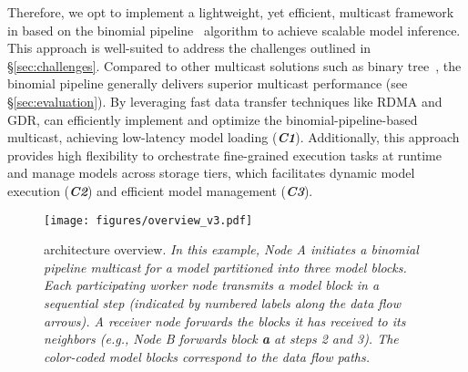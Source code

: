 Therefore, we opt to implement a lightweight, yet efficient, multicast framework in \SysName based on the binomial pipeline~\cite{binomial-pipe,rdmc} algorithm to achieve scalable model inference. 
This approach is well-suited to address the challenges outlined in \S\ref{sec:challenges}. 
Compared to other multicast solutions such as binary tree~\cite{wang_faasnet_nodate}, the binomial pipeline generally delivers superior multicast performance (see \S\ref{sec:evaluation}). 
By leveraging fast data transfer techniques like RDMA and GDR, \SysName can efficiently implement and optimize the binomial-pipeline-based multicast, achieving low-latency model loading (\textbf{\emph{C1}}). 
Additionally, this approach provides high flexibility to orchestrate fine-grained execution tasks at runtime and manage models across storage tiers, which facilitates dynamic model execution (\textbf{\emph{C2}}) and efficient model management (\textbf{\emph{C3}}).


\begin{figure}
    \centering
    \texttt{[image: figures/overview\_v3.pdf]} 
    \vspace{-10pt} 
    \caption{\SysName architecture overview. 
    \textit{\textmd{In this example, Node A initiates a binomial pipeline multicast for a model partitioned into three model blocks. Each participating worker node transmits a model block in a sequential step (indicated by numbered labels along the data flow arrows). 
    A receiver node forwards the blocks it has received to its neighbors (e.g., Node B forwards block \textbf{a} at steps 2 and 3).
    The color-coded model blocks correspond to the data flow paths.}}
    }
    \label{fig:overview}
    \vspace{-10pt} 
\end{figure}

